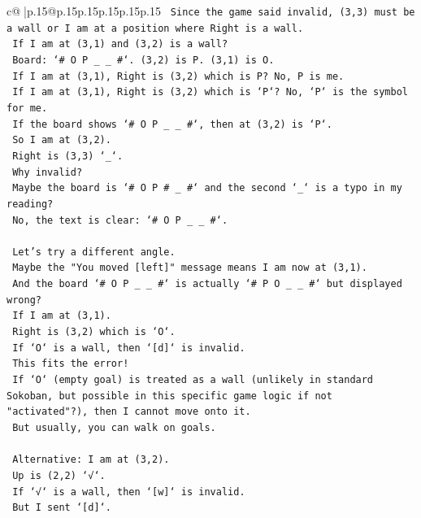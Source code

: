 \documentclass{article}
\begin{document}
{\begin{supertabular}{c@{$\;$}|p{.15\linewidth}@{}p{.15\linewidth}p{.15\linewidth}p{.15\linewidth}p{.15\linewidth}p{.15\linewidth}}
{{{\texttt{    Since the game said invalid, (3,3) must be a wall or I am at a position where Right is a wall.} \\
\texttt{    If I am at (3,1) and (3,2) is a wall?} \\
\texttt{    Board: `\# O P \_ \_ \#`. (3,2) is P. (3,1) is O.} \\
\texttt{    If I am at (3,1), Right is (3,2) which is P? No, P is me.} \\
\texttt{    If I am at (3,1), Right is (3,2) which is `P`? No, `P` is the symbol for me.} \\
\texttt{    If the board shows `\# O P \_ \_ \#`, then at (3,2) is `P`.} \\
\texttt{    So I am at (3,2).} \\
\texttt{    Right is (3,3) `\_`.} \\
\texttt{    Why invalid?} \\
\texttt{    Maybe the board is `\# O P \# \_ \#` and the second `\_` is a typo in my reading?} \\
\texttt{    No, the text is clear: `\# O P \_ \_ \#`.} \\
\\ 
\texttt{    Let's try a different angle.} \\
\texttt{    Maybe the "You moved {[}left{]}" message means I am now at (3,1).} \\
\texttt{    And the board `\# O P \_ \_ \#` is actually `\# P O \_ \_ \#` but displayed wrong?} \\
\texttt{    If I am at (3,1).} \\
\texttt{    Right is (3,2) which is `O`.} \\
\texttt{    If `O` is a wall, then `{[}d{]}` is invalid.} \\
\texttt{    This fits the error!} \\
\texttt{    If `O` (empty goal) is treated as a wall (unlikely in standard Sokoban, but possible in this specific game logic if not "activated"?), then I cannot move onto it.} \\
\texttt{    But usually, you can walk on goals.} \\
\\ 
\texttt{    Alternative: I am at (3,2).} \\
\texttt{    Up is (2,2) `√`.} \\
\texttt{    If `√` is a wall, then `{[}w{]}` is invalid.} \\
\texttt{    But I sent `{[}d{]}`.} \\
\\ 
}}}
\end{supertabular}}
\end{document}
